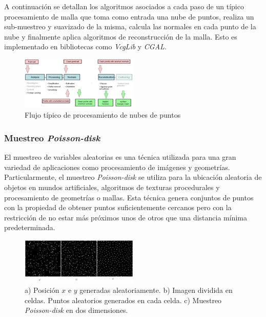 A continuación se detallan los algoritmos asociados a cada paso de un típico procesamiento de malla que toma como entrada una nube de puntos, realiza un sub-muestreo y suavizado de la misma, calcula las normales en cada punto de la nube y finalmente aplica algoritmos de reconstrucción de la malla. Esto es implementado en bibliotecas como \emph{VcgLib}\cite{VCGLib} y \emph{CGAL}\cite{CGAL}.

\begin{figure}[H]
  \centering
    \includegraphics[width=0.5\textwidth]{./Cap2_videomapping/malla-flow.png}
  \caption{Flujo típico de procesamiento de nubes de puntos \cite{CGAL}}
  \label{fig:Mesh-CGAL}
\end{figure}

\subsubsection{Muestreo \emph{Poisson-disk}}

El muestreo de variables aleatorias es una técnica utilizada para una gran variedad de aplicaciones como procesamiento de imágenes y geometrías. Particularmente, el muestreo \emph{Poisson-disk} se utiliza para la ubicación aleatoria de objetos en mundos artificiales, algoritmos de texturas procedurales y procesamiento de geometrías o mallas. Esta técnica genera conjuntos de puntos con la propiedad de obtener puntos suficientemente cercanos pero con la restricción de no estar más próximos unos de otros que una distancia mínima predeterminada.

\begin{figure}[H]
  \centering
    \includegraphics[width=0.5\textwidth]{./Cap2_videomapping/malla-poisson.png}
  \caption{a) Posición $x$ e $y$ generadas aleatoriamente. b) Imagen dividida en celdas. Puntos aleatorios generados en cada celda. c) Muestreo \emph{Poisson-disk} en dos dimensiones.}
  \label{fig:Mesh-Poisson}
\end{figure}

